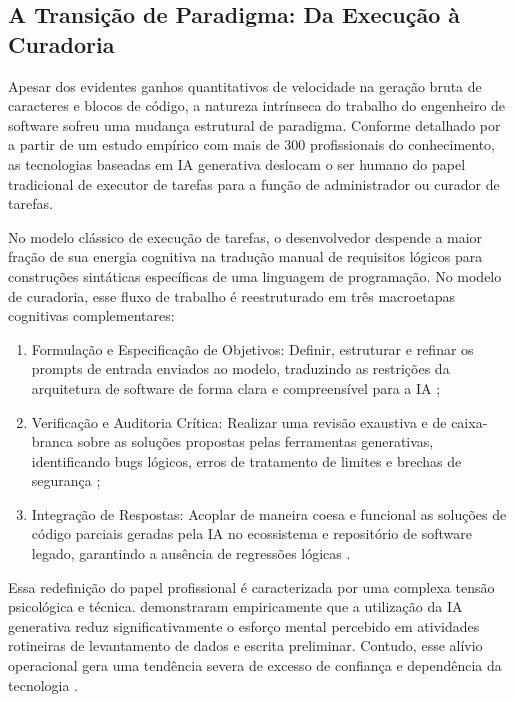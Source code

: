 \subsection{A Transição de Paradigma: Da Execução à Curadoria}

Apesar dos evidentes ganhos quantitativos de velocidade na geração bruta de caracteres e blocos de código, a natureza intrínseca do trabalho do engenheiro de software sofreu uma mudança estrutural de paradigma. Conforme detalhado por  a partir de um estudo empírico com mais de 300 profissionais do conhecimento, as tecnologias baseadas em IA generativa deslocam o ser humano do papel tradicional de executor de tarefas para a função de administrador ou curador de tarefas.

No modelo clássico de execução de tarefas, o desenvolvedor despende a maior fração de sua energia cognitiva na tradução manual de requisitos lógicos para construções sintáticas específicas de uma linguagem de programação. No modelo de curadoria, esse fluxo de trabalho é reestruturado em três macroetapas cognitivas complementares:

\begin{enumerate}
    \item Formulação e Especificação de Objetivos:  Definir, estruturar e refinar os prompts de entrada enviados ao modelo, traduzindo as restrições da arquitetura de software de forma clara e compreensível para a IA \cite{lee2025};
    \item Verificação e Auditoria Crítica: Realizar uma revisão exaustiva e de caixa-branca sobre as soluções propostas pelas ferramentas generativas, identificando bugs lógicos, erros de tratamento de limites e brechas de segurança \cite{lee2025};
    \item Integração de Respostas: Acoplar de maneira coesa e funcional as soluções de código parciais geradas pela IA no ecossistema e repositório de software legado, garantindo a ausência de regressões lógicas \cite{lee2025, jimenez2024}.
\end{enumerate}

Essa redefinição do papel profissional é caracterizada por uma complexa tensão psicológica e técnica.  demonstraram empiricamente que a utilização da IA generativa reduz significativamente o esforço mental percebido em atividades rotineiras de levantamento de dados e escrita preliminar. Contudo, esse alívio operacional gera uma tendência severa de excesso de confiança e dependência da tecnologia \cite{lee2025}. 


